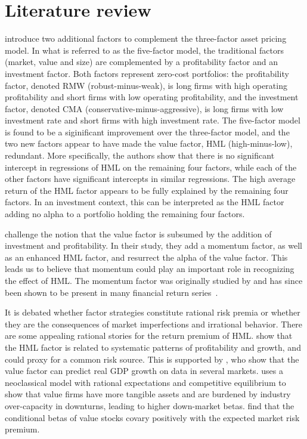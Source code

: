 \section{Literature review}
\textcite{FF2015} introduce two additional factors to complement the \textcite{FamaFrench1993} three-factor asset pricing model. In what is referred to as the five-factor model, the traditional factors (market, value and size) are complemented by a profitability factor and an investment factor. Both factors represent zero-cost portfolios: the profitability factor, denoted RMW (robust-minus-weak), is long firms with high operating profitability and short firms with low operating profitability, and the investment factor, denoted CMA (conservative-minus-aggressive), is long firms with low investment rate and short firms with high investment rate. The five-factor model is found to be a siginificant improvement over the three-factor model, and the two new factors appear to have made the value factor, HML (high-minus-low), redundant. More specifically, the authors show that there is no significant intercept in regressions of HML on the remaining four factors, while each of the other factors have significant intercepts in similar regressions. The high average return of the HML factor appears to be fully explained by the remaining four factors. In an investment context, this can be interpreted as the HML factor adding no alpha to a portfolio holding the remaining four factors.

\textcite{Asness2015} challenge the notion that the value factor is subsumed by the addition of investment and profitability. In their study, they add a momentum factor, as well as an enhanced HML factor, and resurrect the alpha of the value factor. This leads us to believe that momentum could play an important role in recognizing the effect of HML. The momentum factor was originally studied by \textcite{JegadeeshTitman1993} and has since been shown to be present in many financial return series~\autocite{AsnessMoskovitzPedersen2013}.

It is debated whether factor strategies constitute rational risk premia or whether they are the consequences of market imperfections and irrational behavior. There are some appealing rational stories for the return premium of HML. \textcite{FamaFrench1993} show that the HML factor is related to systematic patterns of profitability and growth, and could proxy for a common risk source. This is supported by \textcite{LiewVassalou2000}, who show that the value factor can predict real GDP growth on data in several markets. \textcite{Zhang2005} uses a neoclassical model with rational expectations and competitive equilibrium to show that value firms have more tangible assets and are burdened by industry over-capacity in downturns, leading to higher down-market betas. \textcite{PetkovaZhang2005} find that the conditional betas of value stocks covary positively with the expected market risk premium.


